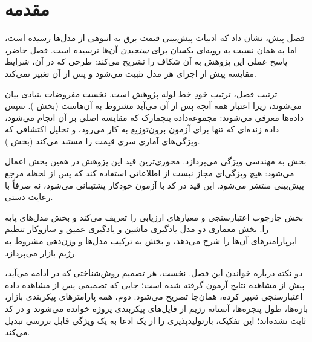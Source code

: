 
\section{مقدمه}

فصل پیش، نشان داد که ادبیات پیش‌بینی قیمت برق به انبوهی از مدل‌ها رسیده
است، اما به همان نسبت به رویه‌ای یکسان برای \emph{سنجیدن} آن‌ها نرسیده
است. فصل حاضر، پاسخ عملی این پژوهش به آن شکاف را تشریح می‌کند: طرحی که در
آن، شرایط مقایسه پیش از اجرای هر مدل تثبیت می‌شود و پس از آن تغییر
نمی‌کند.

ترتیب فصل، ترتیب خودِ خط لوله پژوهش است. نخست مفروضات بنیادی بیان
می‌شوند، زیرا اعتبار همه آنچه پس از آن می‌آید مشروط به آن‌هاست
(بخش ). سپس داده‌ها معرفی می‌شوند: مجموعه‌داده بنچمارک که مقایسه
اصلی بر آن انجام می‌شود، داده زنده‌ای که تنها برای آزمون برون‌توزیع به کار
می‌رود، و تحلیل اکتشافی که ویژگی‌های آماری سری قیمت را مستند می‌کند
(بخش ).

بخش  به مهندسی ویژگی می‌پردازد. محوری‌ترین قید این پژوهش در همین
بخش اعمال می‌شود: هیچ ویژگی‌ای مجاز نیست از اطلاعاتی استفاده کند که پس از
لحظه مرجع پیش‌بینی منتشر می‌شود. این قید در کد با آزمون خودکار پشتیبانی
می‌شود، نه صرفاً با رعایت دستی.

بخش  چارچوب اعتبارسنجی و معیارهای ارزیابی را تعریف می‌کند و بخش
 مدل‌های پایه را. بخش  معماری دو مدل یادگیری ماشین و
یادگیری عمیق و سازوکار تنظیم ابرپارامترهای آن‌ها را شرح می‌دهد، و بخش
 به ترکیب مدل‌ها و وزن‌دهی مشروط به رژیم بازار می‌پردازد.

دو نکته درباره خواندن این فصل. نخست، هر تصمیم روش‌شناختی که در ادامه
می‌آید، پیش از مشاهده نتایج آزمون گرفته شده است؛ جایی که تصمیمی پس از
مشاهده داده اعتبارسنجی تغییر کرده، همان‌جا تصریح می‌شود. دوم، همه
پارامترهای پیکربندی  بازار، بازه‌ها، طول پنجره‌ها، آستانه رژیم
 از فایل‌های پیکربندی پروژه خوانده می‌شوند و در کد ثابت نشده‌اند؛
این تفکیک، بازتولیدپذیری را از یک ادعا به یک ویژگی قابل بررسی تبدیل
می‌کند.
